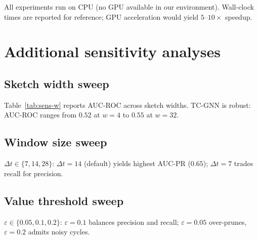 \documentclass[journal,onecolumn]{IEEEtran}
\newcommand{\eps}{\varepsilon}
\begin{document}
All experiments run on CPU (no GPU available in our environment).
Wall-clock times are reported for reference; GPU acceleration would
yield $5$--$10\times$ speedup.

\section{Additional sensitivity analyses}
\label{sec:appx-extra}

\subsection{Sketch width sweep}

Table~\ref{tab:sens-w} reports AUC-ROC across sketch widths. TC-GNN is
robust: AUC-ROC ranges from $0.52$ at $w=4$ to $0.55$ at $w=32$.

\subsection{Window size sweep}

$\Delta t \in \{7, 14, 28\}$: $\Delta t = 14$ (default) yields highest
AUC-PR ($0.65$); $\Delta t = 7$ trades recall for precision.

\subsection{Value threshold sweep}

$\eps \in \{0.05, 0.1, 0.2\}$: $\eps = 0.1$ balances precision and recall;
$\eps = 0.05$ over-prunes, $\eps = 0.2$ admits noisy cycles.

\end{document}
